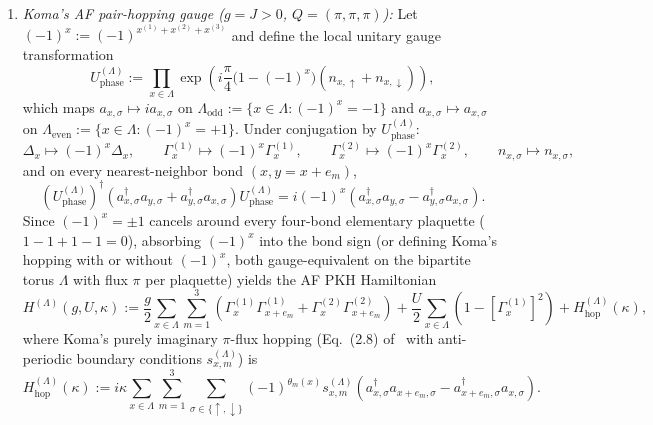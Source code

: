\documentclass[11pt]{article}
\theoremstyle{definition}
\theoremstyle{remark}
\begin{document}
\begin{enumerate}[label=\arabic*.,leftmargin=2em]
\item \emph{Koma's AF pair-hopping gauge ($g = J > 0$, $Q = (\pi,\pi,\pi)$):}
Let $(-1)^x := (-1)^{x^{(1)}+x^{(2)}+x^{(3)}}$ and define the local unitary gauge transformation
\begin{equation}\label{eq:U-phase}
U_{\mathrm{phase}}^{(\Lambda)} := \prod_{x \in \Lambda} \exp\!\left(i\frac{\pi}{4}\bigl(1 - (-1)^x\bigr)(n_{x,\uparrow} + n_{x,\downarrow})\right),
\end{equation}
which maps $a_{x,\sigma} \mapsto i a_{x,\sigma}$ on $\Lambda_{\mathrm{odd}} := \{x \in \Lambda : (-1)^x = -1\}$ and $a_{x,\sigma} \mapsto a_{x,\sigma}$ on $\Lambda_{\mathrm{even}} := \{x \in \Lambda : (-1)^x = +1\}$. Under conjugation by $U_{\mathrm{phase}}^{(\Lambda)}$:
\begin{equation}\label{eq:gauge-map}
\Delta_x \mapsto (-1)^x \Delta_x, \qquad \Gamma_x^{(1)} \mapsto (-1)^x \Gamma_x^{(1)}, \qquad \Gamma_x^{(2)} \mapsto (-1)^x \Gamma_x^{(2)}, \qquad n_{x,\sigma} \mapsto n_{x,\sigma},
\end{equation}
and on every nearest-neighbor bond $(x, y = x+e_m)$,
\begin{equation*}
(U_{\mathrm{phase}}^{(\Lambda)})^\dagger (a_{x,\sigma}^\dagger a_{y,\sigma} + a_{y,\sigma}^\dagger a_{x,\sigma}) U_{\mathrm{phase}}^{(\Lambda)} = i(-1)^x(a_{x,\sigma}^\dagger a_{y,\sigma} - a_{y,\sigma}^\dagger a_{x,\sigma}).
\end{equation*}
Since $(-1)^x = \pm 1$ cancels around every four-bond elementary plaquette ($1 - 1 + 1 - 1 = 0$), absorbing $(-1)^x$ into the bond sign (or defining Koma's hopping with or without $(-1)^x$, both gauge-equivalent on the bipartite torus $\Lambda$ with flux $\pi$ per plaquette) yields the AF PKH Hamiltonian
\begin{equation}\label{eq:H-AF}
H^{(\Lambda)}(g, U, \kappa) := \frac{g}{2} \sum_{x \in \Lambda} \sum_{m=1}^3 \left(\Gamma_x^{(1)}\Gamma_{x+e_m}^{(1)} + \Gamma_x^{(2)}\Gamma_{x+e_m}^{(2)}\right) + \frac{U}{2} \sum_{x \in \Lambda} \left(1 - [\Gamma_x^{(1)}]^2\right) + H_{\mathrm{hop}}^{(\Lambda)}(\kappa),
\end{equation}
where Koma's purely imaginary $\pi$-flux hopping (Eq.~(2.8) of~\cite{koma2022} with anti-periodic boundary conditions $s_{x,m}^{(\Lambda)}$) is
\begin{equation}\label{eq:H-hop-AF}
H_{\mathrm{hop}}^{(\Lambda)}(\kappa) := i\kappa \sum_{x \in \Lambda} \sum_{m=1}^3 \sum_{\sigma \in \{\uparrow,\downarrow\}} (-1)^{\theta_m(x)} s_{x,m}^{(\Lambda)} \left(a_{x,\sigma}^\dagger a_{x+e_m,\sigma} - a_{x+e_m,\sigma}^\dagger a_{x,\sigma}\right).
\end{equation}
\end{enumerate}
\end{document}
